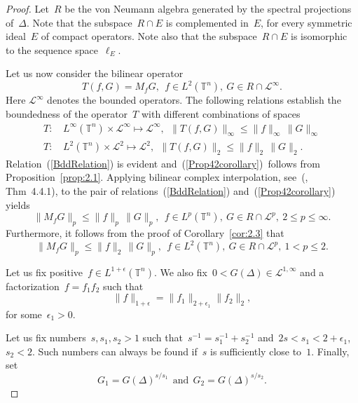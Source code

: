 \documentclass[final,1p]{elsarticle}
\numberwithin{equation}{section}
\theoremstyle{plain}
\theoremstyle{definition}
\newcounter{prop2count}
\begin{document}
\begin{proof}
  Let~$R$ be the von Neumann algebra generated by the spectral projections of~$\Delta$.  Note that
  the subspace~$R \cap E$ is complemented in~$E$, for every symmetric
  ideal~$E$ of compact operators.  Note also that the subspace~$R \cap E$ is isomorphic to the sequence space~$\ell_E$.

  Let us now consider the bilinear operator $$ T(f, G) = M_f G,\
  \ f \in L^2({\ensuremath{\mathbb{T}}}^n),\ G \in R \cap \mathcal{L}^\infty. $$
  Here $\mathcal{L}^\infty$ denotes the bounded operators.  The
  following relations establish the boundedness of the
  operator~$T$ with different combinations of spaces
  \begin{align}
    T: &\, L^\infty({\ensuremath{\mathbb{T}}}^n) \times \mathcal{L}^\infty \mapsto \mathcal{L}^\infty,\ \
    \| T (f, G) \|_\infty \leq \| f \|_\infty \,
    \| G \|_{\infty} \label{BddRelation} \\
    T: &\, L^2({\ensuremath{\mathbb{T}}}^n) \times \mathcal{L}^2 \mapsto \mathcal{L}^2,\ \ \| T (f, G)
    \|_2 \leq \| f \|_2 \,
    \|  G \|_2 . \label{Prop42corollary}
  \end{align}
  Relation~(\ref{BddRelation}) is evident
  and~(\ref{Prop42corollary})~follows from Proposition~\ref{prop:2.1}.
  Applying bilinear complex interpolation,
  see~(\cite{BergLofstrom}, Thm~4.4.1), to the pair of
  relations~(\ref{BddRelation}) and~(\ref{Prop42corollary}) yields
  \begin{equation}
    \label{InterpolationI}
    \| M_f G \|_p \leq \| f \|_{p} \,
    \| G \|_p,\ \ f \in L^p({\ensuremath{\mathbb{T}}}^n),\ G \in R \cap \mathcal{L}^p,\
    2 \leq p \leq \infty. 
  \end{equation}
  Furthermore, it follows from the proof of Corollary~\ref{cor:2.3}
  that
  \begin{equation}
    \label{InterpolationII}
    \| M_f G \|_p \leq \| f \|_2
    \, \| G \|_p,\ \ f \in L^2({\ensuremath{\mathbb{T}}}^n),\ G \in R \cap
    \mathcal{L}^p,\ 1 < p \leq 2.  
  \end{equation}

  Let us fix positive~$f \in L^{1 + \epsilon} ({\ensuremath{\mathbb{T}}}^n)$.
  We also
  fix~$0 < G(\Delta) \in \mathcal{L}^{1, \infty}$ and a
  factorization~$f = f_1 f_2$ such that $$ \| f \|_{1+
    \epsilon} = \| f_1 \|_{2 + \epsilon_1} \|
    f_2 \|_{2}, $$ for some~$\epsilon_1 > 0$.
  
  Let us fix numbers~$s, s_1, s_2 > 1$ such that~$s^{-1} = s^{-1}_1 +
  s^{-1}_2$ and~$2s < s_1 < 2 + \epsilon_1$, $s_2 < 2$.  Such numbers
  can always be found if~$s$ is sufficiently close to~$1$.  Finally, set
  $$
  G_1 = G(\Delta)^{s/s_1} \ \ \text{and}\ \ G_2 = G(\Delta)^{s/s_2}. $$
  

\end{proof}
\end{document}
